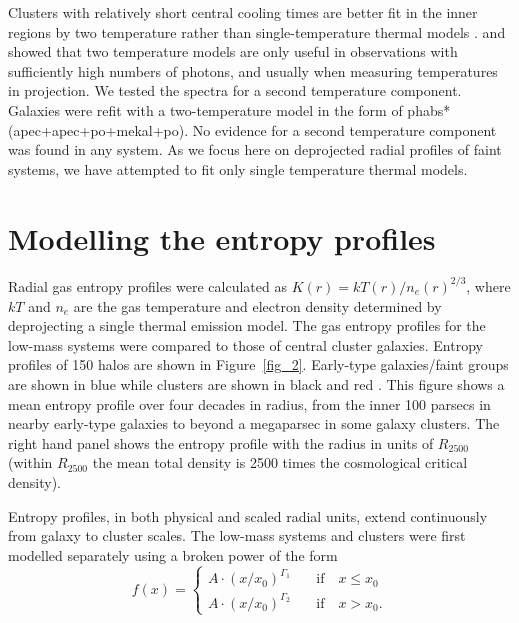\documentclass[apjl]{emulateapj}
\begin{document}
Clusters with relatively short central cooling times are better fit in the inner regions by two temperature rather than single-temperature thermal models \citep{Panagoulia:14, Hogan:17a}. \citet{Hogan:17} and \citet{Hogan:17a} showed that two temperature models are only useful in observations with sufficiently high numbers of photons, and usually when measuring temperatures in projection. {We tested the spectra for a second temperature component. Galaxies were refit with a two-temperature model in the form of {\sc phabs*(apec+apec+po+mekal+po)}. No evidence for a second temperature component was found in any system.} As we focus here on deprojected radial profiles of faint systems, we have attempted to fit only single temperature thermal models.

\section{Modelling the entropy profiles} 

Radial gas entropy profiles were calculated as $K(r)=kT(r)/n_e(r)^{2/3}$, where $kT$ and $n_e$ are the gas temperature and electron density determined by deprojecting a single thermal emission model.  The gas entropy profiles for the low-mass systems were compared to those of central cluster galaxies. Entropy profiles of 150 halos are shown in Figure~\ref{fig_2}. Early-type galaxies/faint groups are shown in blue while clusters are shown in black \citep{Pulido:17} and red \citep{Hogan:17a}. This figure shows a mean entropy profile over four decades in radius, from the inner 100 parsecs in nearby early-type galaxies to beyond a megaparsec in some galaxy clusters.  The right hand panel shows the entropy profile with the radius in units of $R_{2500}$ (within $R_{2500}$ the mean total density is 2500 times the cosmological critical density). 

Entropy profiles, in both physical and scaled radial units, extend continuously from galaxy to cluster scales. The low-mass systems and clusters were first modelled separately using a broken power of the form
\begin{equation}
 f(x) = \begin{cases}
  A\cdot(x/x_0)^{\Gamma_1} & \quad \text{if} \quad x \leq x_0 \\
  A\cdot(x/x_0)^{\Gamma_2} & \quad \text{if} \quad x > x_0.
 \end{cases}
 \label{eq1}
\end{equation}
\end{document}

